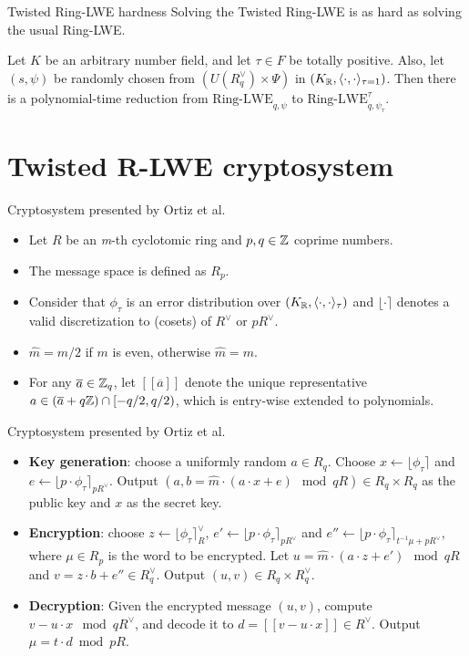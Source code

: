 \documentclass[notheorems, bigger]{beamer}
\begin{document}
\begin{frame}[label={sec:org90f0492}]{Twisted Ring-LWE hardness}
Solving the Twisted Ring-LWE is as hard as solving the usual Ring-LWE.
\begin{theorem}
  \label{theorem:twisted-ring-lwe-hardness}
  Let $K$ be an arbitrary number field, and let $\tau \in F$ be totally positive.
  Also, let $(s,\psi)$ be randomly chosen from $(U(R_q^\vee)\times \Psi)$ in $(K_{\mathbb{R}},\langle{\cdot,\cdot}\rangle_{\tau=1})$.
  Then there is a polynomial-time reduction from $\mbox{Ring-LWE}_{q,\psi}$ to $\mbox{Ring-LWE}^\tau_{q,\psi_\tau}$.
\end{theorem}
\end{frame}
\section{Twisted R-LWE cryptosystem}
\label{sec:org9f527a3}
\begin{frame}[label={sec:orga082b1e}]{Cryptosystem presented by Ortiz et al.}
\begin{itemize}
\item Let \(R\) be an \emph{m}-th cyclotomic ring and \(p, q \in \mathbb{Z}\) coprime numbers.
\item The message space is defined as \(R_p\).
\item Consider that \(\phi_\tau\) is an error distribution over \((K_{\mathbb{R}},\langle{\cdot,\cdot}\rangle_\tau)\) and \(\lfloor{\cdot}\rceil\) denotes a valid discretization to (cosets) of \(R^\vee\) or \(pR^\vee\).
\item \(\hat{m} = m/2\) if \(m\) is even, otherwise \(\hat{m} = m\).
\item For any \(\overline{a} \in \mathbb{Z}_q\), let \([[\overline{a}]]\) denote the unique representative \(a \in (\overline{a} + q\mathbb{Z}) \cap [-q/2, q/2)\), which is entry-wise extended to polynomials.
\end{itemize}
\end{frame}
\begin{frame}[label={sec:org09fb4ff}]{Cryptosystem presented by Ortiz et al.}
 \begin{itemize}
\item \textbf{Key generation}: choose a uniformly random $a \in R_q$. Choose $x
  \longleftarrow \lfloor{\phi_\tau}\rceil$ and $e \longleftarrow \lfloor{p \cdot \phi_\tau}\rceil_{pR^\vee}$. Output $(a,b = \hat{m}\cdot(a \cdot x + e)
  \mod{qR} ) \in R_q \times R_q$ as the public key and $x$ as the secret key.
\item \textbf{Encryption}: choose $z \longleftarrow  \lfloor{\phi_\tau}\rceil_R^\vee$, $e' \longleftarrow \lfloor{p \cdot
    \phi_\tau}\rceil_{pR^\vee}$ and  $e'' \longleftarrow \lfloor{p \cdot \phi_\tau}\rceil_{t^{-1}\mu +pR^\vee}$, where $\mu \in R_p$ is
  the word to be encrypted. Let $u = \hat{m} \cdot (a \cdot z + e') \mod{qR}$ and $v =
  z \cdot b + e'' \in R_q^\vee$. Output $(u,v) \in R_q \times R^\vee_q$.
\item \textbf{Decryption}: Given the encrypted message $(u,v)$, compute $v - u
  \cdot x \mod{qR^\vee}$, and decode it to $d = [[v - u \cdot x]] \in R^\vee$. Output $\mu = t \cdot
  d \bmod{pR}$. 
\end{itemize}
\end{frame}
\end{document}
